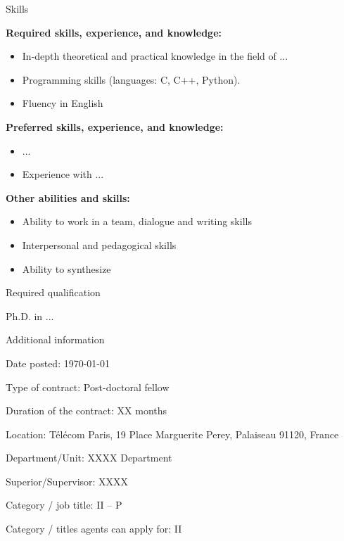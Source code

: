 \begin{graybox}{Skills}

{\bf Required skills, experience, and knowledge: \hfill}


\begin{itemize}
    \item In-depth theoretical and practical knowledge in the field of ...
    \item Programming skills (languages: C, C++, Python).
    \item Fluency in English
\end{itemize}

{\bf Preferred skills, experience, and knowledge: \hfill}

\begin{itemize}
    \item ...
    \item Experience with ...
\end{itemize}


{\bf Other abilities and skills:  \hfill}

\begin{itemize}
    \item     Ability to work in a team, dialogue and writing skills
    \item     Interpersonal and pedagogical skills
    \item     Ability to synthesize
\end{itemize}

\end{graybox}


\begin{graybox}{Required qualification }

Ph.D. in ...

\end{graybox}


\begin{redbox}{Additional information}

Date posted: \today

Type of contract: Post-doctoral fellow

Duration of the contract: XX months


Location: Télécom Paris, 19 Place Marguerite Perey, Palaiseau 91120, France

Department/Unit:   XXXX Department

Superior/Supervisor: XXXX

Category / job title: II – P

Category / titles agents can apply for: II 

\end{redbox}


